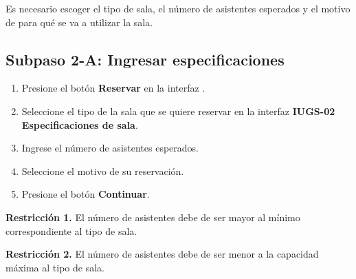 Es necesario escoger el tipo de sala, el número de asistentes esperados y 
el motivo de para qué se va a utilizar la sala.

\subsection{Subpaso 2-A: Ingresar especificaciones}
\begin{enumerate}
	\item Presione el botón \textbf{Reservar} en la interfaz
		.
	\item Seleccione el tipo de la sala que se quiere reservar
		en la interfaz \textbf{IUGS-02 Especificaciones de sala}.
	\item Ingrese el número de asistentes esperados.
	\item Seleccione el motivo de su reservación.
	\item Presione el botón \textbf{Continuar}.
\end{enumerate}

\textbf{Restricción 1.} El número de asistentes debe de ser mayor al 
	mínimo correspondiente al tipo de sala. 

\textbf{Restricción 2.} El número de asistentes debe de ser menor a la
	capacidad máxima al tipo de sala.


